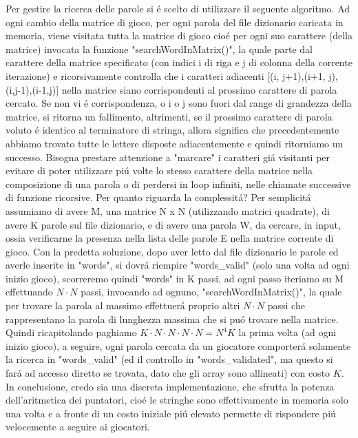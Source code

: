 Per gestire la ricerca delle parole si \'e scelto di utilizzare il seguente algoritmo. Ad ogni cambio della matrice di gioco, per ogni parola del file dizionario caricata in memoria, viene visitata tutta la matrice di gioco cio\'e per ogni suo carattere (della matrice) invocata la funzione "searchWordInMatrix()", la quale parte dal carattere della matrice specificato (con indici i di riga e j di colonna della corrente iterazione) e ricorsivamente controlla che i caratteri adiacenti [(i, j+1),(i+1, j),(i,j-1),(i-1,j)] nella matrice siano corrispondenti al prossimo carattere di parola cercato. Se non vi \'e corrispondenza, o i o j sono fuori dal range di grandezza della matrice, si ritorna un fallimento, altrimenti, se il prossimo carattere di parola voluto \'e identico al terminatore di stringa, allora significa che precedentemente abbiamo trovato tutte le lettere disposte adiacentemente e quindi ritorniamo un successo. Bisogna prestare attenzione a "marcare" i caratteri gi\'a visitanti per evitare di poter utilizzare pi\'u volte lo stesso carattere della matrice nella composizione di una parola o di perdersi in loop infiniti, nelle chiamate successive di funzione ricorsive. Per quanto riguarda la complessit\'a? Per semplicit\'a assumiamo di avere M, una matrice N x N (utilizzando matrici quadrate), di avere K parole sul file dizionario, e di avere una parola W, da cercare, in input, ossia verificarne la presenza nella lista delle parole E nella matrice corrente di gioco. Con la predetta soluzione, dopo aver letto dal file dizionario le parole ed averle inserite in "words", si dovr\'a riempire "words\_valid" (solo una volta ad ogni inizio gioco), scorreremo quindi "words" in K passi, ad ogni passo iteriamo su M effettuando $N \cdot N$ passi, invocando ad ognuno, "searchWordInMatrix()", la quale per trovare la parola al massimo effettuer\'a proprio altri $N \cdot N$ passi che rappresentano la parola di lunghezza massima che si pu\'o trovare nella matrice.
\\
Quindi ricapitolando paghiamo $ K \cdot N \cdot N \cdot N \cdot N = N^4K $ la prima volta (ad ogni inizio gioco), a seguire, ogni parola cercata da un giocatore comporter\'a solamente la ricerca in "words\_valid" (ed il controllo in "words\_validated", ma questo si far\'a ad accesso diretto se trovata, dato che gli array sono allineati) con costo $ K $. In conclusione, credo sia una discreta implementazione, che sfrutta la potenza dell'aritmetica dei puntatori, cio\'e le stringhe sono effettivamente in memoria solo una volta e a fronte di un costo iniziale pi\'u elevato permette di rispondere pi\'u velocemente a seguire ai giocatori.
\\

